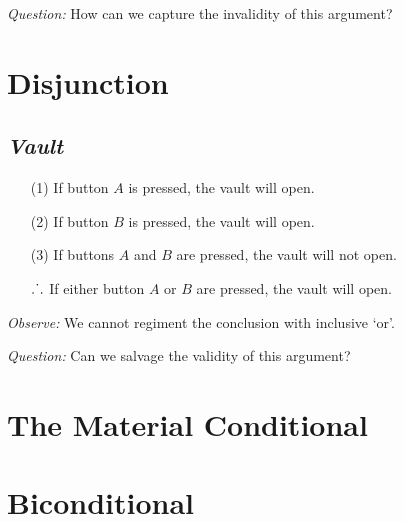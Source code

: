 \documentclass[a4paper, 11pt]{article} %
\def\therefore{\ensuremath{\ldotp\dot{}\,\ldotp}}
\begin{document}
\noindent
\textit{Question:} How can we capture the invalidity of this argument?




\section*{Disjunction}

\subsection*{\it \textbf{Vault}}

\begin{enumerate}
  \item[(1)] If button $A$ is pressed, the vault will open. 
  \item[(2)] If button $B$ is pressed, the vault will open.
  \item[(3)] If buttons $A$ and $B$ are pressed, the vault will not open.
  \item[\therefore] If either button $A$ or $B$ are pressed, the vault will open. 
\end{enumerate}

\noindent
\textit{Observe:} We cannot regiment the conclusion with inclusive `or'.
\vspace{.05in}

\noindent
\textit{Question:} Can we salvage the validity of this argument?



\section*{The Material Conditional}




\section*{Biconditional}





%
\end{document}
